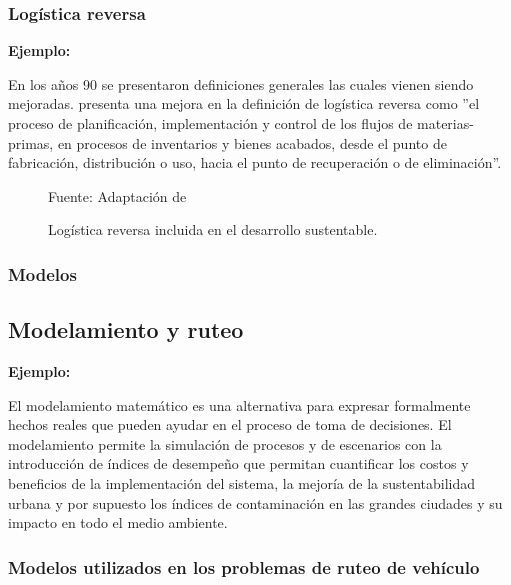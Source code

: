 \subsubsection{Logística reversa}

{\bf Ejemplo:}\par

En los años 90 se presentaron definiciones generales las cuales vienen siendo mejoradas. \cite{Dekker} presenta una mejora en la definición de logística reversa como  ”el proceso de planificación, implementación y control de los flujos de materias-primas, en procesos de inventarios y bienes acabados, desde el punto de fabricación, distribución o uso, hacia el punto de recuperación o de eliminación”. 
\begin{figure}[ht]
\begin{center}
\end{center}
\begin{center}
\vskip -0.5cm
\caption{\small{Logística reversa incluida en el desarrollo sustentable.}}
{\small{Fuente: Adaptación de \cite{Tanguay}}}
\end{center}
\end{figure}


\subsubsection{Modelos}

\subsection{Modelamiento y ruteo }

{\bf Ejemplo:}\par

El modelamiento matemático es una alternativa para expresar formalmente hechos reales que pueden ayudar en el proceso de toma de decisiones. El modelamiento permite la simulación de procesos  y de escenarios con la introducción de índices de desempeño que permitan cuantificar los costos y beneficios de la implementación del sistema, la mejoría de la sustentabilidad urbana y por supuesto los índices de contaminación en las grandes ciudades y su impacto en todo el medio ambiente. 

\subsubsection{Modelos utilizados en los problemas de ruteo de vehículo }

